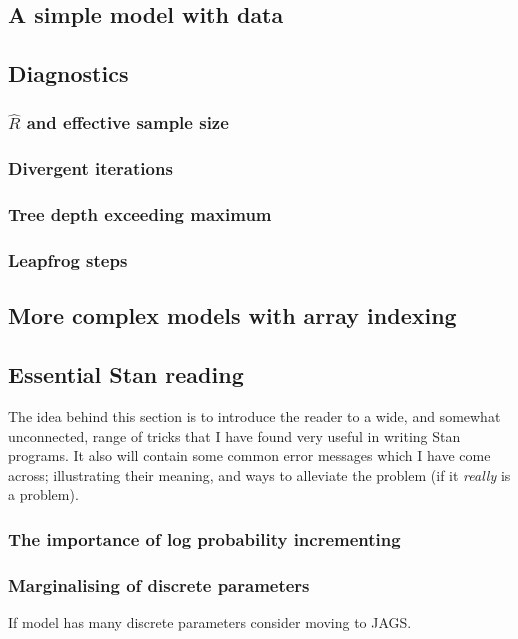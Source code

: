 \documentclass[11pt,fullpage]{book}
\begin{document}
\subsection{A simple model with data}

\subsection{Diagnostics}
\subsubsection{$\hat{R}$ and effective sample size}
\subsubsection{Divergent iterations}
\subsubsection{Tree depth exceeding maximum}
\subsubsection{Leapfrog steps}

\subsection{More complex models with array indexing}

\subsection{Essential Stan reading}
The idea behind this section is to introduce the reader to a wide, and somewhat unconnected, range of tricks that I have found very useful in writing Stan programs. It also will contain some common error messages which I have come across; illustrating their meaning, and ways to alleviate the problem (if it \textit{really} is a problem).

\subsubsection{The importance of log probability incrementing}
\subsubsection{Marginalising of discrete parameters}
If model has many discrete parameters consider moving to JAGS.
\end{document}
